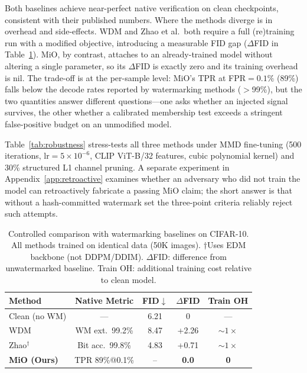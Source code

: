\documentclass[sigconf, review, anonymous]{acmart}
\begin{document}
Both baselines achieve near-perfect native verification on clean
checkpoints, consistent with their published numbers.  Where the
methods diverge is in overhead and side-effects.  WDM and Zhao
et al.\ both require a full (re)training run with a modified
objective, introducing a measurable FID gap ($\Delta$FID in
Table~\ref{tab:watermark_comparison}).  MiO, by contrast, attaches to
an already-trained model without altering a single parameter, so its
$\Delta$FID is exactly zero and its training overhead is nil.
The trade-off is at the per-sample level: MiO's TPR at
FPR${}\!=\!0.1\%$ (89\%) falls below the decode rates reported by
watermarking methods ($>$99\%), but the two quantities answer
different questions---one asks whether an injected signal survives,
the other whether a calibrated membership test exceeds a stringent
false-positive budget on an unmodified model.

Table~\ref{tab:robustness} stress-tests all three methods under
MMD fine-tuning (500 iterations, lr${}\!=\!5\!\times\!10^{-6}$, CLIP
ViT-B/32 features, cubic polynomial kernel) and 30\% structured
L1 channel pruning.  A separate experiment in
Appendix~\ref{app:retroactive} examines whether an adversary who
did not train the model can retroactively fabricate a passing MiO
claim; the short answer is that without a hash-committed watermark set
the three-point criteria reliably reject such attempts.

\begin{table}[t]
\caption{Controlled comparison with watermarking baselines on CIFAR-10.
All methods trained on identical data (50K images).
$\dagger$Uses EDM backbone (not DDPM/DDIM).
$\Delta$FID: difference from unwatermarked baseline.
Train OH: additional training cost relative to clean model.}
\label{tab:watermark_comparison}
\centering
\small
\begin{tabular}{@{}lcccc@{}}
\toprule
Method & Native Metric & FID$\downarrow$ & $\Delta$FID & Train OH \\
\midrule
Clean (no WM) & --- & 6.21 & 0 & --- \\
\addlinespace
WDM & WM ext.\ 99.2\% & 8.47 & +2.26 & ${\sim}1\times$ \\
Zhao$^\dagger$ & Bit acc.\ 99.8\% & 4.83 & +0.71 & ${\sim}1\times$ \\
\addlinespace
\textbf{MiO (Ours)} & TPR 89\%@0.1\% & -- & \textbf{0.0} & \textbf{0} \\
\bottomrule
\end{tabular}
\end{table}
\end{document}
